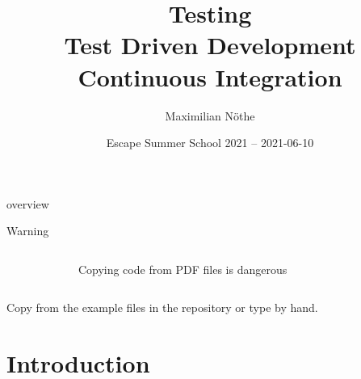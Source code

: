 
\author[M. Nöthe]{Maximilian Nöthe}
\title[Testing]{Testing \\ Test Driven Development \\ Continuous Integration}
\date[2021-03-10]{Escape Summer School 2021 – 2021-06-10}


\maketitle

\begin{frame}[c]{overview}
  \tableofcontents
\end{frame}

\begin{frame}[c]{Warning}
  \centering
  \Large\color{vertexDarkRed}
  \vspace{3\baselineskip}

  \begin{columns}[onlytextwidth, c]%
    \begin{column}{0.15\textwidth}%
      \fontsize{60}{60}\selectfont%
    \end{column}%
    \hfill%
    \begin{column}{0.7\textwidth}%
      \centering
      Copying code from PDF files is dangerous \\
    \end{column}%
    \hfill%
    \begin{column}{0.15\textwidth}%
      \hfill%
      \fontsize{60}{60}\selectfont%
      \hfill{}%
    \end{column}%
  \end{columns}%

  \vspace{2\baselineskip}
  Copy from the example files in the repository or type by hand.
\end{frame}

\section{Introduction}

